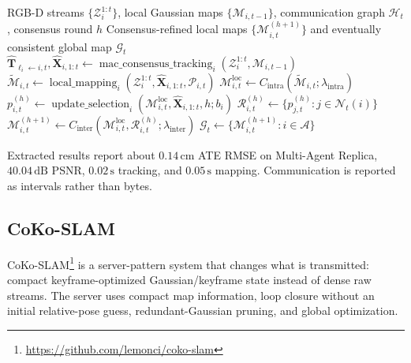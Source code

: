 \documentclass[11pt, a4paper, logo]{googledeepmind}
\begin{document}
\begin{algorithm}[H]
\caption{MAC-Ego3D}
\label{alg:mac-ego3d}
\small
\begin{algorithmic}[1]
  \Require RGB-D streams $\{\mathcal{Z}_i^{1:t}\}$, local Gaussian maps $\{\mathcal{M}_{i,t-1}\}$, communication graph $\mathcal{H}_t$, consensus round $h$
  \Ensure Consensus-refined local maps $\{\mathcal{M}_{i,t}^{(h+1)}\}$ and eventually consistent global map $\mathcal{G}_t$
  \State $\hat{\mathbf{T}}_{\ell_i\leftarrow i,t},\hat{\mathbf{X}}_{i,1:t} \gets \operatorname{mac\_consensus\_tracking}_i(\mathcal{Z}_i^{1:t},\mathcal{M}_{i,t-1})$ 
  \State $\tilde{\mathcal{M}}_{i,t} \gets \operatorname{local\_mapping}_i(\mathcal{Z}_i^{1:t},\hat{\mathbf{X}}_{i,1:t},\mathcal{P}_{i,t})$ 
  \State $\mathcal{M}_{i,t}^{\mathrm{loc}} \gets C_{\mathrm{intra}}(\tilde{\mathcal{M}}_{i,t};\lambda_{\mathrm{intra}})$ 
  \State $p_{i,t}^{(h)} \gets \operatorname{update\_selection}_i(\mathcal{M}_{i,t}^{\mathrm{loc}},\hat{\mathbf{X}}_{i,1:t},h;b_i)$ 
  \State $\mathcal{R}_{i,t}^{(h)} \gets \{p_{j,t}^{(h)}:j\in\mathcal{N}_t(i)\}$ 
  \State $\mathcal{M}_{i,t}^{(h+1)} \gets C_{\mathrm{inter}}(\mathcal{M}_{i,t}^{\mathrm{loc}},\mathcal{R}_{i,t}^{(h)};\lambda_{\mathrm{inter}})$ 
  \State $\mathcal{G}_t \gets \{\mathcal{M}_{i,t}^{(h+1)}:i\in\mathcal{A}\}$ 
\end{algorithmic}
\end{algorithm}

Extracted results report about $0.14\,\mathrm{cm}$ ATE RMSE on Multi-Agent Replica, $40.04\,\mathrm{dB}$ PSNR, $0.02\,\mathrm{s}$ tracking, and $0.05\,\mathrm{s}$ mapping. Communication is reported as intervals rather than bytes.

\subsection{CoKo-SLAM}
\label{sec:systems:coko-slam}

CoKo-SLAM\footnote{\url{https://github.com/lemonci/coko-slam}} \citep{li2026coko_slam} is a server-pattern system that changes what is transmitted: compact keyframe-optimized Gaussian/keyframe state instead of dense raw streams. The server uses compact map information, loop closure without an initial relative-pose guess, redundant-Gaussian pruning, and global optimization.
\end{document}
